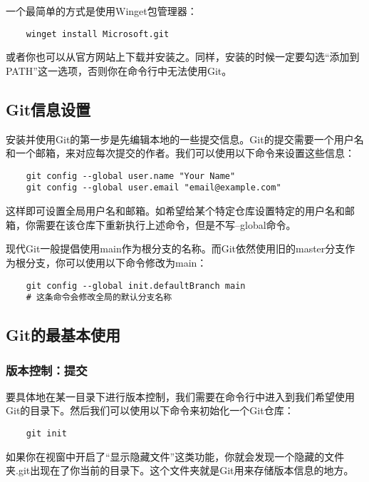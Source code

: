 \documentclass[../main.tex]{subfiles}
\begin{document}
一个最简单的方式是使用Winget包管理器：

\begin{verbatim}
    winget install Microsoft.git
\end{verbatim}

或者你也可以从官方网站上下载并安装之。同样，安装的时候一定要勾选“添加到PATH”这一选项，否则你在命令行中无法使用Git。

\subsection{Git信息设置}

安装并使用Git的第一步是先编辑本地的一些提交信息。Git的提交需要一个用户名和一个邮箱，来对应每次提交的作者。我们可以使用以下命令来设置这些信息：

\begin{verbatim}
    git config --global user.name "Your Name"
    git config --global user.email "email@example.com"
\end{verbatim}

这样即可设置全局用户名和邮箱。如希望给某个特定仓库设置特定的用户名和邮箱，你需要在该仓库下重新执行上述命令，但是不写--global命令。

现代Git一般提倡使用main作为根分支的名称。而Git依然使用旧的master分支作为根分支，你可以使用以下命令修改为main：

\begin{verbatim}
    git config --global init.defaultBranch main 
    # 这条命令会修改全局的默认分支名称
\end{verbatim}

\subsection{Git的最基本使用}

\subsubsection{版本控制：提交}

要具体地在某一目录下进行版本控制，我们需要在命令行中进入到我们希望使用Git的目录下。然后我们可以使用以下命令来初始化一个Git仓库：

\begin{verbatim}
    git init
\end{verbatim}

如果你在视窗中开启了“显示隐藏文件”这类功能，你就会发现一个隐藏的文件夹.git出现在了你当前的目录下。这个文件夹就是Git用来存储版本信息的地方。
\end{document}

